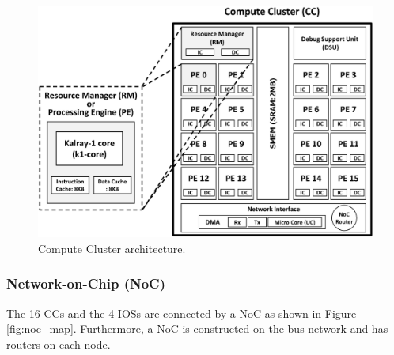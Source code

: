 \documentclass{sig-alternate-05-2015}
\begin{document}
\begin{figure}[t]
  \centering
  \includegraphics[width=1.0\linewidth]{../figure/cc_architecture.eps}
  \caption{\label{fig:cc_architecture}
    Compute Cluster architecture.}
\end{figure}


\subsubsection{Network-on-Chip (NoC)}
\label{sec:noc}
The 16 CCs and the 4 IOSs are connected by a NoC as shown in Figure \ref{fig:noc_map}.
Furthermore, a NoC is constructed on the bus network and has routers on each node.
\end{document}
